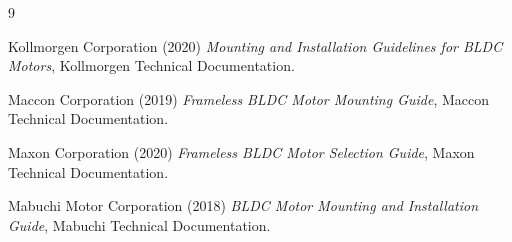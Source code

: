 \documentclass[internal]{../../classes/nervtech-research}
\begin{document}
\clearpage

\begin{thebibliography}{9}

Kollmorgen Corporation (2020) \emph{Mounting and Installation Guidelines for BLDC Motors}, Kollmorgen Technical Documentation.

Maccon Corporation (2019) \emph{Frameless BLDC Motor Mounting Guide}, Maccon Technical Documentation.

Maxon Corporation (2020) \emph{Frameless BLDC Motor Selection Guide}, Maxon Technical Documentation.

Mabuchi Motor Corporation (2018) \emph{BLDC Motor Mounting and Installation Guide}, Mabuchi Technical Documentation.

\end{thebibliography}
\end{document}
